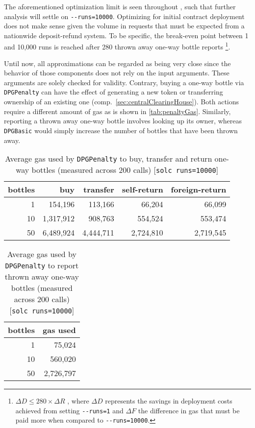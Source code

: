 \begin{appendices}
\FloatBarrier

The aforementioned optimization limit is seen throughout , such that further analysis will settle on \texttt{-{}-runs=10000}. Optimizing for initial contract deployment does not make sense given the volume in requests that must be expected from a nationwide deposit-refund system. To be specific, the break-even point between 1 and 10,000 runs is reached after 280 thrown away one-way bottle reports \footnote{$ \Delta D \leq 280 \times \Delta R$ , where $\Delta D$ represents the savings in deployment costs achieved from setting \texttt{-{}-runs=1} and $\Delta F$ the difference in gas that must be paid more when compared to \texttt{-{}-runs=10000}.}. 

Until now, all approximations can be regarded as being very close since the behavior of those components does not rely on the input arguments. These arguments are solely checked for validity. Contrary, buying a one-way bottle via \texttt{DPGPenalty} can have the effect of generating a new token or transferring ownership of an existing one (comp.~\ref{sec:centralClearingHouse}). Both actions require a different amount of gas as is shown in \autoref{tab:penaltyGas}. Similarly, reporting a thrown away one-way bottle involves looking up its owner, whereas \texttt{DPGBasic} would simply increase the number of bottles that have been thrown away.

\begin{table}[hbt]
	\centering	
	\begin{tabular}{r|r|r|r|r}
    	bottles & buy & transfer & self-return & foreign-return \\
    	\hline
    	1 & 154,196 & 113,166 & 66,204 & 66,099 \\
    	10 & 1,317,912 & 908,763 & 554,524 & 553,474 \\ 
    	50 & 6,489,924 & 4,444,711 & 2,724,810 & 2,719,545 \\
	\end{tabular}
	\caption[Average gas used to buy, transfer and return one-way bottles]{Average gas used by \texttt{DPGPenalty} to buy, transfer and return one-way bottles (measured across 200 calls) [\texttt{solc runs=10000}]}
	\label{tab:penaltyGas}
\end{table}

\begin{table}[hbt]
	\centering	
	\begin{tabular}{r|r}
    	bottles & gas used \\
    	\hline
    	1 & 75,024 \\
    	10 & 560,020 \\ 
    	50 & 2,726,797 \\
	\end{tabular}
	\caption[Average gas used to buy, transfer and return one-way bottles]{Average gas used by \texttt{DPGPenalty} to report thrown away one-way bottles (measured across 200 calls) [\texttt{solc runs=10000}]}
	\label{tab:penaltyGas}
\end{table}


\end{appendices}
